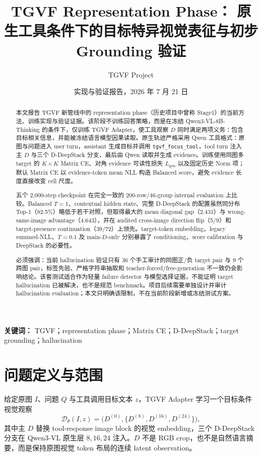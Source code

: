 \documentclass[UTF8,twocolumn,10pt,a4paper]{ctexart}
\title{\vspace{-1.0em}\textbf{TGVF Representation Phase：\newline
原生工具条件下的目标特异视觉表征与初步 Grounding 验证}}
\author{TGVF Project}
\date{实现与验证报告，2026 年 7 月 21 日}
\newcommand{\DMain}{D^{(0)}}
\newcommand{\DDS}{\{D^{(8)},D^{(16)},D^{(24)}\}}
\newcommand{\code}[1]{\texttt{#1}}
\begin{document}
\maketitle
\vspace{-1.55em}

\begin{abstract}
本文报告 TGVF 新管线中的 representation phase（历史项目中曾称 Stage1）的当前方法、训练实现与验证证据。该阶段不训练回答策略，而是在冻结 Qwen3-VL-8B-Thinking 的条件下，仅训练 TGVF Adapter，使工具观察 $D$ 同时满足两项义务：包含目标相关信息，并能被冻结语言模型因果读取。原生轨迹严格采用 Qwen 工具格式：原图与问题进入 user turn，assistant 生成目标并调用 \code{tgvf\_focus\_tool}，tool turn 注入主 $D$ 与三个 D-DeepStack 分支，最后由 Qwen 读取并生成 evidence。训练使用同图多 target 的 $K\times K$ Matrix CE、对角 evidence 可读性损失 $L_{\mathrm{gen}}$ 以及固定历史 Norm 项；默认 Matrix CE 以 evidence-token mean NLL 构造 Balanced score，避免 evidence 长度直接改变 cell 尺度。

五个 2,000-step checkpoint 在完全一致的 200-row/46-group internal evaluation 上比较。Balanced $T=1$、contextual hidden state、完整 D-DeepStack 的配置虽然同分布 Top-1（82.5\%）略低于若干对照，但取得最大的 mean diagonal gap（2.431）与 wrong-same-image advantage（4.643），并在 audited cross-image direction flip（5/9）和 target-presence continuation（39/72）上领先。target-token embedding、legacy summed-NLL、$T=0.1$ 及 main-$D$-only 分别暴露了 conditioning、score calibration 与 DeepStack 的必要性。

必须强调：当前 hallucination 验证只有 36 个手工审计的同图正/负 target pair 与 9 个跨图 pair，标签先验、严格字符串抽取和 teacher-forced/free-generation 不一致仍会影响结论。该套测试适合作为轻量 failure detector 与模型选择证据，不能证明 target hallucination 已被解决，也不是规范 benchmark。项目后续需要单独设计并审计 hallucination evaluation；本文只明确该限制，不在当前阶段新增或冻结测试方案。
\end{abstract}

\noindent\textbf{关键词：} TGVF；representation phase；Matrix CE；D-DeepStack；target grounding；hallucination

\section{问题定义与范围}
给定原图 $I$、问题 $Q$ 与工具调用目标文本 $z$，TGVF Adapter 学习一个目标条件视觉观察
\begin{equation}
  \mathcal D_\theta(I,z)
  =\bigl(\DMain,\DDS\bigr),
  \label{eq:observation}
\end{equation}
其中主 $D$ 替换 tool-response image block 的视觉 embedding，三个 D-DeepStack 分支在 Qwen3-VL 原生层 $8,16,24$ 注入。$D$ 不是 RGB crop，也不是自然语言摘要，而是保持原图视觉 token 布局的连续 latent observation。
\end{document}
